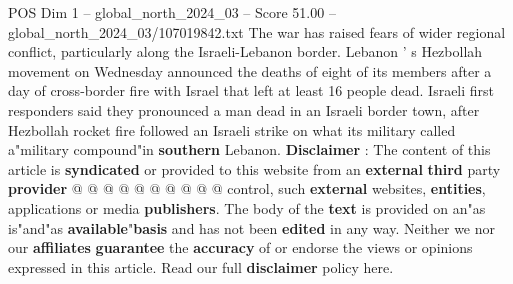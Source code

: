 \begin{textsample}{POS Dim 1 – global\_north\_2024\_03 – Score 51.00 – global\_north\_2024\_03/107019842.txt}
The war has raised fears of wider regional conflict, particularly along the Israeli-Lebanon border.
Lebanon ' s Hezbollah movement on Wednesday announced the deaths of eight of its members after a day of cross-border fire with Israel that left at least 16 people dead.
Israeli first responders said they pronounced a man dead in an Israeli border town, after Hezbollah rocket fire followed an Israeli strike on what its military called a"military compound"in \textbf{southern} Lebanon. \textbf{Disclaimer} : The content of this article is \textbf{syndicated} or provided to this website from an \textbf{external} \textbf{third} party \textbf{provider} @ @ @ @ @ @ @ @ @ @ control, such \textbf{external} websites, \textbf{entities}, applications or media \textbf{publishers}.
The body of the \textbf{text} is provided on an"as is"and"as \textbf{available}"\textbf{basis} and has not been \textbf{edited} in any way.
Neither we nor our \textbf{affiliates} \textbf{guarantee} the \textbf{accuracy} of or endorse the views or opinions expressed in this article.
Read our full \textbf{disclaimer} policy here.

\end{textsample}
